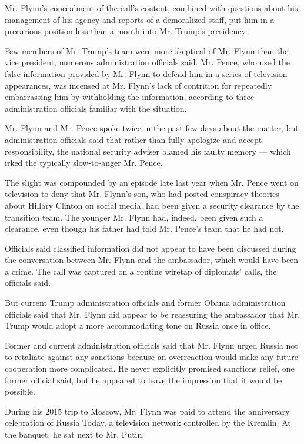 Mr. Flynn's concealment of the call's content, combined with
\href{https://www.nytimes.com/2017/02/12/us/politics/national-security-council-turmoil.html}{questions
about his management of his agency} and reports of a demoralized staff,
put him in a precarious position less than a month into Mr. Trump's
presidency.

Few members of Mr. Trump's team were more skeptical of Mr. Flynn than
the vice president, numerous administration officials said. Mr. Pence,
who used the false information provided by Mr. Flynn to defend him in a
series of television appearances, was incensed at Mr. Flynn's lack of
contrition for repeatedly embarrassing him by withholding the
information, according to three administration officials familiar with
the situation.

Mr. Flynn and Mr. Pence spoke twice in the past few days about the
matter, but administration officials said that rather than fully
apologize and accept responsibility, the national security adviser
blamed his faulty memory --- which irked the typically slow-to-anger Mr.
Pence.

The slight was compounded by an episode late last year when Mr. Pence
went on television to deny that Mr. Flynn's son, who had posted
conspiracy theories about Hillary Clinton on social media, had been
given a security clearance by the transition team. The younger Mr. Flynn
had, indeed, been given such a clearance, even though his father had
told Mr. Pence's team that he had not.

Officials said classified information did not appear to have been
discussed during the conversation between Mr. Flynn and the ambassador,
which would have been a crime. The call was captured on a routine
wiretap of diplomats' calls, the officials said.

But current Trump administration officials and former Obama
administration officials said that Mr. Flynn did appear to be reassuring
the ambassador that Mr. Trump would adopt a more accommodating tone on
Russia once in office.

Former and current administration officials said that Mr. Flynn urged
Russia not to retaliate against any sanctions because an overreaction
would make any future cooperation more complicated. He never explicitly
promised sanctions relief, one former official said, but he appeared to
leave the impression that it would be possible.

During his 2015 trip to Moscow, Mr. Flynn was paid to attend the
anniversary celebration of Russia Today, a television network controlled
by the Kremlin. At the banquet, he sat next to Mr. Putin.

